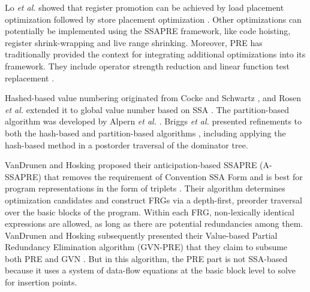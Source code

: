 Lo {\it et al.} showed that register promotion can be achieved by
load placement optimization followed by store placement 
optimization \cite{Lo98}.
Other optimizations can potentially be implemented using the SSAPRE
framework, like code hoisting, register shrink-wrap\-ping \cite{Chow88} and 
live range shrinking.  Moreover, PRE has 
traditionally provided the context for integrating additional optimizations 
into its framework.  They include operator strength reduction \cite{Knoop93} 
and linear function test replacement \cite{Kennedy98}.  

Hashed-based value numbering originated from Cocke and Schwartz \cite{CS70}, and
Rosen {\it et al.} extended it to global value number based on 
SSA \cite{Rosen88}.  The partition-based algorithm was developed by
Alpern {\it et al.} \cite{AWZ88}.  Briggs {\it et al.} presented refinements
to both the hash-based and partition-based algorithms \cite{Briggs97},
including applying the hash-based method in a postorder traversal of the 
dominator tree.

VanDrunen and Hosking proposed their anticipation-based SSAPRE (A-SSAPRE) that
removes the requirement of Convention SSA Form and is best
for program representations in the form of triplets \cite{Vandrunen03}.
Their algorithm determines optimization candidates and construct FRGs via
a depth-first, preorder traversal over the basic blocks of the program.
Within each FRG, non-lexically identical expressions are allowed, as long 
as there are potential redundancies among them.  VanDrunen and Hosking
subsequently presented their Value-based Partial Redundancy Elimination
algorithm (GVN-PRE) that they claim to subsume both PRE and 
GVN \cite{Vandrunen04}.  But in this algorithm, the PRE part is not SSA-based
because it uses a system of data-flow equations at the basic block level
to solve for insertion points.
